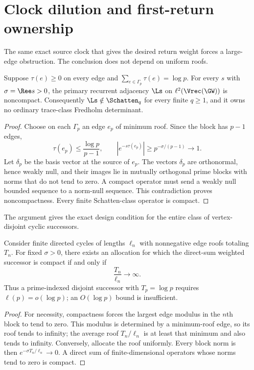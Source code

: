 \section{Clock dilution and first-return ownership}
\label{sec:clock-return}

The same exact source clock that gives the desired return weight forces a
large-edge obstruction.  The conclusion does not depend on uniform roofs.

\begin{theorem}
\label{thm:noncompact}
Suppose $\tau(e)\geq0$ on every edge and
$\sum_{e\in\Gamma_p}\tau(e)=\log p$.  For every $s$ with
$\sigma=\Ree s>0$, the primary recurrent adjacency $\Ls$ on
$\ell^2(\Vrec(\GW))$ is noncompact.  Consequently
$\Ls\notin\Schatten_q$ for every finite $q\geq1$, and it owns no ordinary
trace-class Fredholm determinant.
\end{theorem}

\begin{proof}
Choose on each $\Gamma_p$ an edge $e_p$ of minimum roof.  Since the block has
$p-1$ edges,
\[
  \tau(e_p)\leq\frac{\log p}{p-1},\qquad
  |e^{-s\tau(e_p)}|
  \geq p^{-\sigma/(p-1)}\longrightarrow1.
\]
Let $\delta_p$ be the basis vector at the source of $e_p$.  The vectors
$\delta_p$ are orthonormal, hence weakly null, and their images lie in
mutually orthogonal prime blocks with norms that do not tend to zero.  A
compact operator must send a weakly null bounded sequence to a norm-null
sequence.  This contradiction proves noncompactness.  Every finite
Schatten-class operator is compact.
\end{proof}

The argument gives the exact design condition for the entire class of
vertex-disjoint cyclic successors.

\begin{corollary}
\label{cor:length-criterion}
Consider finite directed cycles of lengths $\ell_n$ with nonnegative edge
roofs totaling $T_n$.  For fixed $\sigma>0$, there exists an allocation for
which the direct-sum weighted successor is compact if and only if
\[
  \frac{T_n}{\ell_n}\longrightarrow\infty.
\]
Thus a prime-indexed disjoint successor with $T_p=\log p$ requires
$\ell(p)=o(\log p)$; an $O(\log p)$ bound is insufficient.
\end{corollary}

\begin{proof}
For necessity, compactness forces the largest edge modulus in the $n$th block
to tend to zero.  This modulus is determined by a minimum-roof edge, so its
roof tends to infinity; the average roof $T_n/\ell_n$ is at least that
minimum and also tends to infinity.  Conversely, allocate the roof uniformly.
Every block norm is then $e^{-\sigma T_n/\ell_n}\to0$.  A direct sum of
finite-dimensional operators whose norms tend to zero is compact.
\end{proof}

